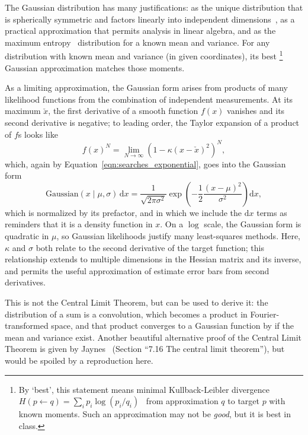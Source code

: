 The Gaussian distribution has many justifications:
as the unique distribution that is spherically symmetric and factors linearly
into independent dimensions~\cite{
jaynes2003probability,
herschel1850normal,
maxwell1860normal,
muller1959note,
marsaglia1972normal
},
as a practical approximation that permits analysis in linear algebra,
and as the maximum entropy~\cite{PhysRev.106.620} distribution for a
known mean and variance.
For any distribution with known mean and variance (in given coordinates),
its best%
\footnote{%
By `best', this statement means minimal Kullback-Leibler divergence
\(
H(p\leftarrow q) = \sum_i p_i \log(p_i/q_i)
\)~\cite{
skilling2010foundations
}
from approximation $q$ to target $p$ with known moments.
Such an approximation may not be \emph{good}, but it is best in class.%
}
Gaussian approximation matches those moments.

As a limiting approximation, the Gaussian form arises from products of many
likelihood functions from the combination of independent measurements.
At its maximum $\check{x}$, the first derivative of a smooth function $f(x)$
vanishes and its second derivative is negative;
to leading order, the Taylor expansion of a product of $f$s looks like
\begin{equation}
f(x)^N =
\lim_{N \to \infty}\!
\left(
1 - \kappa (x - \check{x})^2
\right)^N,
\end{equation}
which, again by Equation~\ref{eqn:searches_exponential}, goes into the Gaussian
form
\begin{equation}
\label{eqn:searches_gaussian}
\mathrm{Gaussian}(x\mid \mu, \sigma)
\,\mathrm{d}x =
\frac{1}{\sqrt{2\pi \sigma^2}}
\exp\!\left(-\frac{1}{2}\frac{(x - \mu)^2}{\sigma^2}\right)
\mathrm{d}x
,
\end{equation}
which is normalized by its prefactor, and in which we include the
$\mathrm{d}x$ terms as reminders that it is a density function in $x$.
On a $\log$ scale, the Gaussian form is quadratic in $\mu$, so
Gaussian likelihoods justify many least-squares methods.
Here, $\kappa$ and $\sigma$ both relate to the second derivative of the target
function; this relationship extends to multiple dimensions in the Hessian
matrix and its inverse, and permits the useful approximation of estimate error
bars from second derivatives.

This is not the Central Limit Theorem, but can be used to derive it: the
distribution of a sum is a convolution, which becomes a product in
Fourier-transformed space, and that product converges to a Gaussian function by
if the mean and variance exist.
Another beautiful alternative proof of the Central Limit Theorem is given by
Jaynes~\cite{jaynes2003probability}
(Section ``7.16 The central limit theorem''), but would be spoiled by a
reproduction here.

